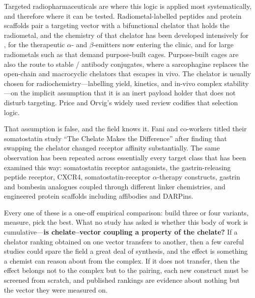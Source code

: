 \documentclass[twoside,twocolumn,9pt]{article}
\begin{document}
Targeted radiopharmaceuticals are where this logic is applied most systematically, and therefore where it can be tested. Radiometal-labelled peptides and protein scaffolds pair a targeting vector with a bifunctional chelator that holds the radiometal, and the chemistry of that chelator has been developed intensively for ,\cite{Spang2023GaChelators,Sinnes2020b} for the therapeutic $\alpha$- and $\beta$-emitters now entering the clinic,\cite{Hennrich2026TAT,Mcneil2023Pb} and for large radiometals such as  that demand purpose-built cages.\cite{Deberle2025Th227} Purpose-built cages are also the route to stable / antibody conjugates, where a sarcophagine replaces the open-chain and macrocyclic chelators that  escapes in vivo.\cite{Rudd2025ChemSci} The chelator is usually chosen for radiochemistry---labelling yield, kinetics, and in-vivo complex stability---on the implicit assumption that it is an inert payload holder that does not disturb targeting. Price and Orvig's widely used review codifies that selection logic.\cite{PriceOrvig2014}

That assumption is false, and the field knows it. Fani and co-workers titled their somatostatin study ``The Chelate Makes the Difference'' after finding that swapping the chelator changed receptor affinity substantially.\cite{Fani2011} The same observation has been repeated across essentially every target class that has been examined this way: somatostatin receptor antagonists,\cite{Nicolas2018,Fani2021,Zhang2024JR11} the gastrin-releasing peptide receptor,\cite{Varasteh2015,Abouzayed2019,Guenther2022,Abouzayed2023,Bodei2025,Mitran2016,Mitran2019} CXCR4,\cite{Poschenrieder2016a,Poschenrieder2020,Osl2020} somatostatin-receptor $\alpha$-therapy constructs,\cite{Stallons2022} gastrin and bombesin analogues coupled through different linker chemistries,\cite{Maina2018,Greifenstein2021} and engineered protein scaffolds including affibodies and DARPins.\cite{Rinne2019b,Oroujeni2025,Krasniqi2024}

Every one of these is a one-off empirical comparison: build three or four variants, measure, pick the best. What no study has asked is whether this body of work is cumulative---\textbf{is chelate--vector coupling a property of the chelate?} If a chelator ranking obtained on one vector transfers to another, then a few careful studies could spare the field a great deal of synthesis, and the effect is something a chemist can reason about from the complex. If it does not transfer, then the effect belongs not to the complex but to the pairing, each new construct must be screened from scratch, and published rankings are evidence about nothing but the vector they were measured on.
\end{document}
